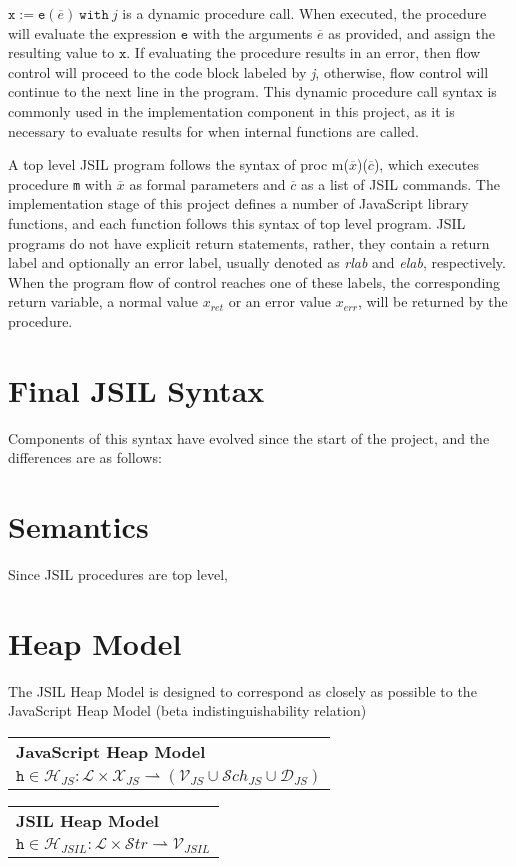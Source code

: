 \documentclass[a4paper,11pt,twoside]{report}
\begin{document}
$\mathtt{x} := \mathtt{e}(\overline{e})\ \mathtt{with}\ \textit{j}$ is a dynamic procedure call. When executed, the procedure will evaluate the expression $\mathtt{e}$ with the arguments $\overline{e}$ as provided, and assign the resulting value to $\mathtt{x}$. If evaluating the procedure results in an error, then flow control will proceed to the code block labeled by \textit{j}, otherwise, flow control will continue to the next line in the program. This dynamic procedure call syntax is commonly used in the implementation component in this project, as it is necessary to evaluate results for when internal functions are called.

A top level JSIL program follows the syntax of proc m($\overline{x}$)($\overline{c}$), which executes procedure \texttt{m} with $\overline{x}$ as formal parameters and $\overline{c}$ as a list of JSIL commands. The implementation stage of this project defines a number of JavaScript library functions, and each function follows this syntax of top level program. JSIL programs do not have explicit return statements, rather, they contain a return label and optionally an error label, usually denoted as \textit{rlab} and \textit{elab}, respectively. When the program flow of control reaches one of these labels, the corresponding return variable, a normal value $x_{ret}$ or an error value $x_{err}$, will be returned by the procedure.

\section{Final JSIL Syntax}
Components of this syntax have evolved since the start of the project, and the differences are as follows:

\section{Semantics}
Since JSIL procedures are top level, 

\section{Heap Model}
The JSIL Heap Model is designed to correspond as closely as possible to the JavaScript Heap Model (beta indistinguishability relation)


\begin{center}
\begin{tabular}{p{9cm}} \hline
\textbf{JavaScript Heap Model} \\
$\texttt{h} \in \mathcal{H}_{JS} : \mathcal{L} \times \mathcal{X}_{JS} \rightharpoonup (\mathcal{V}_{JS} \cup \mathcal{S}ch_{JS} \cup \mathcal{D}_{JS})$  \\ \hline
\end{tabular}
\vspace{0.3cm}
\begin{tabular}{p{9cm}} \hline
\textbf{JSIL Heap Model} \\
$\texttt{h} \in \mathcal{H}_{JSIL} : \mathcal{L} \times \mathcal{S}tr \rightharpoonup \mathcal{V}_{JSIL}  $  \\ \hline
\end{tabular}
\end{center}
\end{document}

